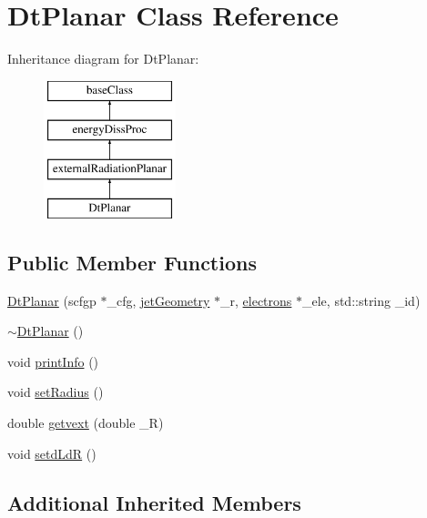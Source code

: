\hypertarget{classDtPlanar}{\section{Dt\-Planar Class Reference}
\label{classDtPlanar}
}
Inheritance diagram for Dt\-Planar\-:\begin{figure}[H]
\begin{center}
\leavevmode
\includegraphics[height=4.000000cm]{classDtPlanar}
\end{center}
\end{figure}
\subsection*{Public Member Functions}
\begin{DoxyCompactItemize}
\item 
\hyperlink{classDtPlanar_a5d5b77f9362b9dccca97df093cf96ab2}{Dt\-Planar} (scfgp $\ast$\-\_\-cfg, \hyperlink{classjetGeometry}{jet\-Geometry} $\ast$\-\_\-r, \hyperlink{classelectrons}{electrons} $\ast$\-\_\-ele, std\-::string \-\_\-id)
\item 
\hyperlink{classDtPlanar_a5ce5e082dab0dbeea9b11c2fae22cfb8}{$\sim$\-Dt\-Planar} ()
\item 
void \hyperlink{classDtPlanar_a0d1b6697d54a08030ed50b7e4b5fbfef}{print\-Info} ()
\item 
void \hyperlink{classDtPlanar_aaa8956b3aa5b8ecff5e746a8ba84a67c}{set\-Radius} ()
\item 
double \hyperlink{classDtPlanar_a46eb0e18c9a391adccffe2623dd3dfbe}{getvext} (double \-\_\-\-R)
\item 
void \hyperlink{classDtPlanar_a6445269d74ae176c5d299ac71cd7ac87}{setd\-Ld\-R} ()
\end{DoxyCompactItemize}
\subsection*{Additional Inherited Members}


